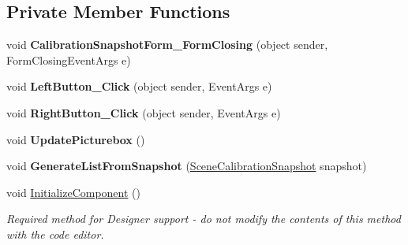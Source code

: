 \subsection*{Private Member Functions}
\begin{DoxyCompactItemize}
\item 
\mbox{\label{class_chess_tracking_1_1_user_interface_1_1_calibration_snapshot_form_af9ef74ca57d53b3175e3c96b6dc1208c}} 
void {\bfseries Calibration\+Snapshot\+Form\+\_\+\+Form\+Closing} (object sender, Form\+Closing\+Event\+Args e)
\item 
\mbox{\label{class_chess_tracking_1_1_user_interface_1_1_calibration_snapshot_form_a91575463dd3e7003ec4f22775450b1fb}} 
void {\bfseries Left\+Button\+\_\+\+Click} (object sender, Event\+Args e)
\item 
\mbox{\label{class_chess_tracking_1_1_user_interface_1_1_calibration_snapshot_form_ad8b8025174f4fa94066902d7b8dd9aba}} 
void {\bfseries Right\+Button\+\_\+\+Click} (object sender, Event\+Args e)
\item 
\mbox{\label{class_chess_tracking_1_1_user_interface_1_1_calibration_snapshot_form_ae849b5ba26b88cf7abc9290f8dced8df}} 
void {\bfseries Update\+Picturebox} ()
\item 
\mbox{\label{class_chess_tracking_1_1_user_interface_1_1_calibration_snapshot_form_a560d83bad9a5ae51a9510493cdb64959}} 
void {\bfseries Generate\+List\+From\+Snapshot} (\mbox{\hyperlink{class_chess_tracking_1_1_image_processing_1_1_pipeline_data_1_1_scene_calibration_snapshot}{Scene\+Calibration\+Snapshot}} snapshot)
\item 
void \mbox{\hyperlink{class_chess_tracking_1_1_user_interface_1_1_calibration_snapshot_form_a84e93b5390fd2142c6eee5686b638a13}{Initialize\+Component}} ()
\begin{DoxyCompactList}\small\item\em Required method for Designer support -\/ do not modify the contents of this method with the code editor. \end{DoxyCompactList}\end{DoxyCompactItemize}
